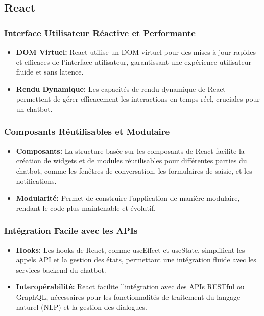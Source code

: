 \subsection{React}


\subsubsection{Interface Utilisateur Réactive et Performante}

\begin{itemize}
  \item \textbf{DOM Virtuel: }React utilise un DOM virtuel pour des mises à jour rapides et efficaces de l'interface utilisateur, garantissant une expérience utilisateur fluide et sans latence.
  \item \textbf{Rendu Dynamique: }Les capacités de rendu dynamique de React permettent de gérer efficacement les interactions en temps réel, cruciales pour un chatbot.
\end{itemize}

\subsubsection{Composants Réutilisables et Modulaire}
 
\begin{itemize}
  \item \textbf{Composants: }La structure basée sur les composants de React facilite la création de widgets et de modules réutilisables pour différentes parties du chatbot, comme les fenêtres de conversation, les formulaires de saisie, et les notifications.
  \item \textbf{Modularité: }Permet de construire l'application de manière modulaire, rendant le code plus maintenable et évolutif.
\end{itemize}

\subsubsection{Intégration Facile avec les APIs}

\begin{itemize}
  \item \textbf{Hooks: }Les hooks de React, comme useEffect et useState, simplifient les appels API et la gestion des états, permettant une intégration fluide avec les services backend du chatbot.
  \item \textbf{Interopérabilité: }React facilite l'intégration avec des APIs RESTful ou GraphQL, nécessaires pour les fonctionnalités de traitement du langage naturel (NLP) et la gestion des dialogues.
\end{itemize}

